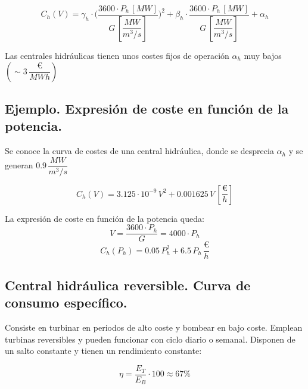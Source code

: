 			\[C_h(V) = \gamma_h \cdot \Biggl(\dfrac{3600\cdot P_h\,[MW]}{G\,\left[\dfrac{MW}{m^3/s}\right]}\Biggl)^2 + \beta_h \cdot 
			\dfrac{3600\cdot P_h\,[MW]}{G\,\left[\dfrac{MW}{m^3/s}\right]} + \alpha_h\]
			
			Las centrales hidráulicas tienen unos costes fijos de operación $\alpha_h$ muy bajos $\left(\sim3\,\dfrac{\euro}{MWh}\right)$
			
		\subsection*{Ejemplo. Expresión de coste en función de la potencia.}
			Se conoce la curva de costes de una central hidráulica, donde se desprecia $\alpha_h$ y se generan $0.9\,\dfrac{MW}{m^3/s}$
			
			\[C_h(V) = 3.125\cdot 10^{-9}\,V^2 + 0.001625\,V\,\left[\dfrac{\euro}{h}\right]\]
			
			La expresión de coste en función de la potencia queda:
			\[V = \dfrac{3600\cdot P_h}{G} = 4000\cdot P_h\]
			\[C_h(P_h) = 0.05\,P_h^2 + 6.5\,P_h\,\dfrac{\euro}{h}\]
			
		\subsection{Central hidráulica reversible. Curva de consumo específico.}
			Consiste en turbinar en periodos de alto coste y bombear en bajo coste. Emplean turbinas reversibles y pueden funcionar con ciclo diario o semanal. Disponen de un salto constante y tienen un rendimiento constante:
			
			\[\eta = \dfrac{E_T}{E_B}\cdot 100 \approx 67\%\]
			
